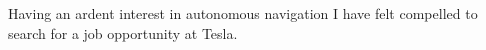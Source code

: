 Having an ardent interest in autonomous navigation I have felt compelled to search for a job opportunity at Tesla.\\\smallskip
